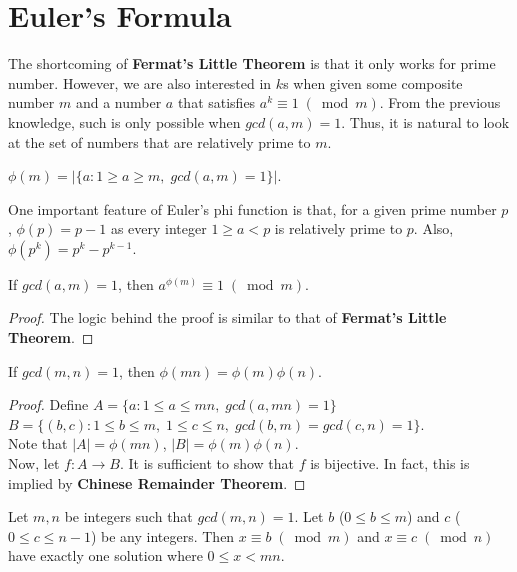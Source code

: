 \section{Euler's Formula}

The shortcoming of \textbf{Fermat's Little Theorem} is that it only works for prime number. However, we are also interested in $k$s when given some composite number $m$ and a number $a$ that satisfies $a^{k}\equiv 1\; (\bmod{m})$. From the previous knowledge, such is only possible when $gcd(a, m) = 1$. Thus, it is natural to look at the set of numbers that are relatively prime to $m$.

\begin{definition}
  $\phi(m) = |\{a: 1\geq a\geq m,\; gcd(a, m) = 1\}|$.
\end{definition}

One important feature of Euler's phi function is that, for a given prime number $p$, $\phi(p) = p - 1$ as every integer $1\geq a < p$ is relatively prime to $p$. Also, $\phi(p^{k}) = p^{k} - p^{k - 1}$.

\begin{theorem}
  If $gcd(a, m) = 1$, then $a^{\phi(m)}\equiv 1\; (\bmod{m})$.
\end{theorem}

\begin{proof}
The logic behind the proof is similar to that of \textbf{Fermat's Little Theorem}.
\end{proof}

\begin{theorem}
If $gcd(m, n) = 1$, then $\phi(mn) = \phi(m)\phi(n)$.
\end{theorem}

\begin{proof}
Define $A = \{a: 1\leq a\leq mn, \; gcd(a, mn) = 1\}$ \\
$B = \{(b, c): 1\leq b\leq m, \; 1\leq c\leq n,\; gcd(b, m) = gcd(c, n) = 1\}$. \\
Note that $|A| = \phi(mn)$, $|B| = \phi(m)\phi(n)$. \\
Now, let $f: A\to B$. It is sufficient to show that $f$ is bijective. In fact, this is implied by \textbf{Chinese Remainder Theorem}.
\end{proof}

\begin{theorem}
Let $m, n$ be integers such that $gcd(m, n) = 1$. Let $b$ ($0\leq b\leq m$) and $c$ ($0\leq c\leq n - 1$) be any integers. Then $x\equiv b\; (\bmod{m})$ and $x\equiv c\; (\bmod{n})$ have exactly one solution where $0\leq x < mn$.
\end{theorem}

